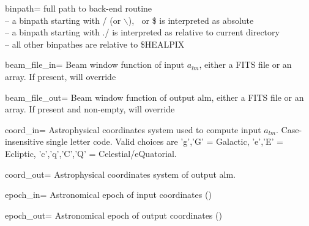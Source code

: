 \begin{keywords}
  \begin{kwlist}{} %

 \item[binpath=]  full path to back-end routine \\
              -- a binpath starting with / (or $\backslash$), $~$ or \$ is interpreted as absolute\\
              -- a binpath starting with ./ is interpreted as relative to current directory\\
              -- all other binpathes are relative to \$HEALPIX

 \item[beam\_file\_in=] Beam window function of input $a_{lm}$,
                 either a FITS file or an array. If present, will override

 \item[beam\_file\_out=]  Beam window function of output alm, 
                 either a FITS file or an array. If present and non-empty, will override

 \item[coord\_in=]      Astrophysical coordinates system used to compute input $a_{lm}$.
                 Case-insensitive single letter code.
                 Valid choices are 'g','G' = Galactic, 'e','E' = Ecliptic,
                 'c','q','C','Q' = Celestial/eQuatorial.

 \item[coord\_out=]     Astrophysical coordinates system of output alm.

 \item[epoch\_in=]      Astronomical epoch of input coordinates 
()
 \item[epoch\_out=]     Astronomical epoch of output coordinates 
()


\end{kwlist}
\end{keywords}
